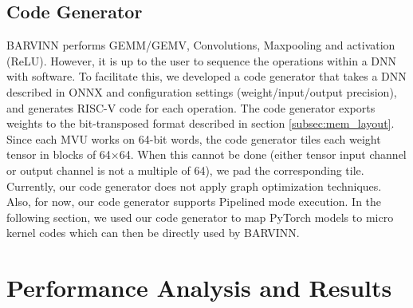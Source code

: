 \documentclass[sigconf]{acmart}
\newcommand{\MVU}{MVU}
\newcommand{\barvinn}{BARVINN}
\newcommand{\BARVINN}{BARVINN}
\begin{document}



\subsection{Code Generator}

\BARVINN{} performs GEMM/GEMV, Convolutions, Maxpooling and activation (ReLU). However, it is up to the user to sequence the operations within a DNN with software. To facilitate this, we developed a code generator that takes a DNN described in ONNX \cite{onnx} and configuration settings (weight/input/output precision), and  generates RISC-V code for each operation. The code generator exports weights to the bit-transposed format described in section \ref{subsec:mem_layout}. Since each \MVU{} works on 64-bit words, the code generator tiles each weight tensor in blocks of 64$\times$64. When this cannot be done (either tensor input channel or output channel is not a multiple of 64), we pad the corresponding tile. Currently, our code generator does not apply graph optimization techniques. Also, for now, our code generator supports Pipelined mode execution. In the following section, we used our code generator to map PyTorch models to micro kernel codes which can then be directly used by \barvinn{}.


\section{Performance Analysis and Results}
\label{sec:perf_analysis}
\end{document}
